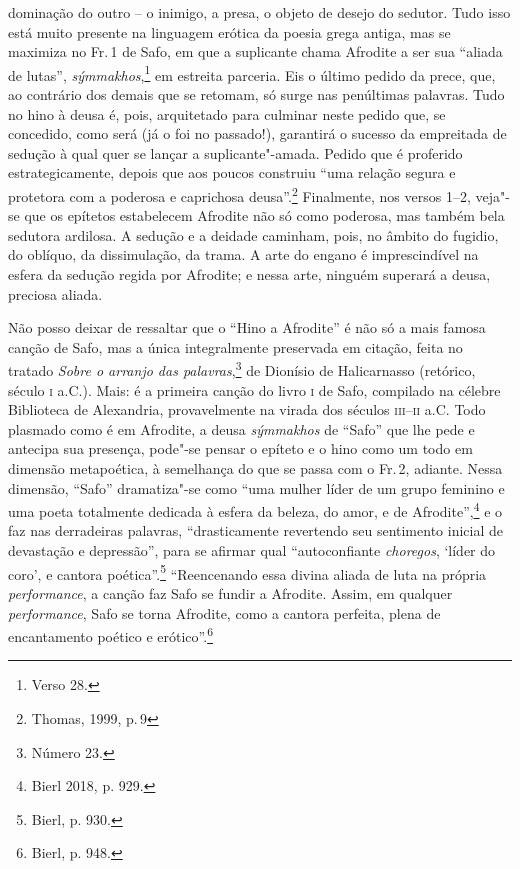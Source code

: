 {dominação do outro -- o inimigo, a presa, o objeto de desejo do sedutor. Tudo
isso está muito presente na linguagem erótica da poesia grega antiga, mas se
maximiza no Fr.\,1 de Safo, em que a suplicante chama Afrodite a ser sua
``aliada de lutas'', \textit{sýmmakhos},\footnote{Verso 28.} em estreita parceria. Eis o último pedido da prece, que, ao contrário dos demais que se retomam, só surge nas penúltimas palavras. Tudo no hino à deusa é, pois, arquitetado para culminar neste pedido que, se concedido, como será (já o foi no passado!), garantirá o sucesso da empreitada de sedução à qual quer se lançar a suplicante"-amada. Pedido que é proferido estrategicamente, depois que aos poucos construiu ``uma relação segura e protetora com a poderosa e caprichosa deusa''.\footnote{Thomas, 1999, p.\,9} Finalmente, nos versos 1--2, veja"-se
que os epítetos estabelecem Afrodite não só como poderosa, mas também bela
sedutora ardilosa. A sedução e a deidade caminham, pois, no âmbito do fugidio,
do oblíquo, da dissimulação, da trama. A arte do engano é imprescindível na
esfera da sedução regida por Afrodite; e nessa arte, ninguém superará a deusa,
preciosa aliada.

Não posso deixar de ressaltar que o ``Hino a Afrodite'' é não só
a mais famosa canção de Safo, mas a única integralmente preservada em citação, feita no tratado \textit{Sobre o arranjo das palavras},\footnote{Número 23.} de Dionísio de Halicarnasso (retórico, século \textsc{i} a.C.). Mais: é a primeira canção do livro \textsc{i} de Safo,
compilado na célebre Biblioteca de Alexandria, provavelmente na virada dos
séculos \textsc{iii}--\textsc{ii} a.C.
Todo plasmado como é em Afrodite, a deusa \textit{sýmmakhos} de ``Safo'' que lhe pede e antecipa sua presença, pode"-se pensar o epíteto e o hino como um todo em dimensão metapoética, à semelhança do que se passa com o Fr.\,2, adiante. Nessa dimensão, ``Safo'' dramatiza"-se como ``uma mulher líder de um grupo feminino e uma poeta totalmente dedicada à esfera da beleza, do amor, e de Afrodite'',\footnote{Bierl 2018, p. 929.} e o faz nas derradeiras palavras, ``drasticamente revertendo seu sentimento inicial de devastação e depressão'', para se afirmar qual ``autoconfiante \textit{choregos}, ‘líder do coro’, e cantora poética''.\footnote{Bierl, p. 930.} ``Reencenando essa divina aliada de luta na própria \textit{performance}, a canção faz Safo se fundir a Afrodite. Assim, em qualquer \textit{performance}, Safo se torna Afrodite, como a cantora perfeita, plena de encantamento poético e erótico''.\footnote{Bierl, p. 948.}}

